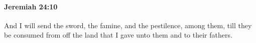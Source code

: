 
		\paragraph{Jeremiah 24:10} %
			\label{JEREMIAH-24-10}

			And I will send the sword, the famine, and the pestilence, among them, till they be consumed from off the land that I gave unto them and to their fathers.

